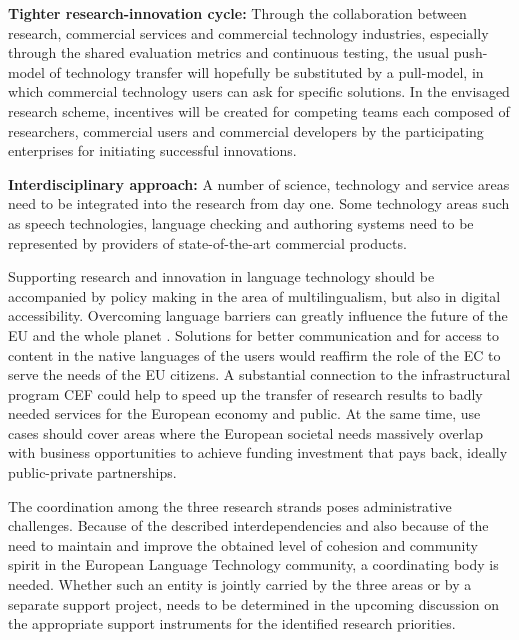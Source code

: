 \documentclass[10pt, plain]{../../metanetpaper}
\begin{document}
\begin{multicols}{2}
\textbf{Tighter research-innovation cycle:} Through the collaboration between research, commercial services and commercial technology industries, especially through the shared evaluation metrics and continuous testing, the usual push-model of technology transfer will hopefully be substituted by a pull-model, in which commercial technology users can ask for specific solutions. In the envisaged research scheme, incentives will be created for competing teams each composed of researchers, commercial users and commercial developers by the participating enterprises for initiating successful innovations.

\textbf{Interdisciplinary approach:} A number of science, technology and service areas need to be integrated into the research from day one. Some technology areas such as speech technologies, language checking and authoring systems need to be represented by providers of state-of-the-art commercial products.

Supporting research and innovation in language technology should be accompanied by policy making in the area of multilingualism, but also in digital accessibility. Overcoming language barriers can greatly influence the future of the EU and the whole planet \cite{maaya2012,ifa2008,ifa2011}. Solutions for better communication and for access to content in the native languages of the users would reaffirm the role of the EC to serve the needs of the EU citizens. A substantial connection to the infrastructural program CEF could help to speed up the transfer of research results to badly needed services for the European economy and public. At the same time, use cases should cover areas where the European societal needs massively overlap with business opportunities to achieve funding investment that pays back, ideally public-private partnerships.
 
The coordination among the three research strands poses administrative challenges. Because of the described interdependencies and also because of the need to maintain and improve the obtained level of cohesion and community spirit in the European Language Technology community, a coordinating body is needed. Whether such an entity is jointly carried by the three areas or by a separate support project, needs to be determined in the upcoming discussion on the appropriate support instruments for the identified research priorities.
\end{multicols}

\end{document}
